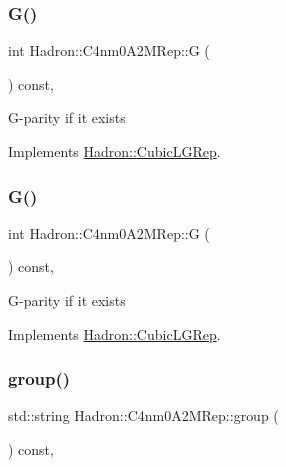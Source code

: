\subsubsection{\texorpdfstring{G()}{G()}\hspace{0.1cm}{\footnotesize\ttfamily [2/3]}}
{\footnotesize\ttfamily int Hadron\+::\+C4nm0\+A2\+M\+Rep\+::G (\begin{DoxyParamCaption}{ }\end{DoxyParamCaption}) const\hspace{0.3cm}{\ttfamily [inline]}, {\ttfamily [virtual]}}

G-\/parity if it exists 

Implements \mbox{\hyperlink{structHadron_1_1CubicLGRep_ace26f7b2d55e3a668a14cb9026da5231}{Hadron\+::\+Cubic\+L\+G\+Rep}}.

\mbox{\label{structHadron_1_1C4nm0A2MRep_a36640a5b382aca709c5523a79cef513f}} 
\subsubsection{\texorpdfstring{G()}{G()}\hspace{0.1cm}{\footnotesize\ttfamily [3/3]}}
{\footnotesize\ttfamily int Hadron\+::\+C4nm0\+A2\+M\+Rep\+::G (\begin{DoxyParamCaption}{ }\end{DoxyParamCaption}) const\hspace{0.3cm}{\ttfamily [inline]}, {\ttfamily [virtual]}}

G-\/parity if it exists 

Implements \mbox{\hyperlink{structHadron_1_1CubicLGRep_ace26f7b2d55e3a668a14cb9026da5231}{Hadron\+::\+Cubic\+L\+G\+Rep}}.

\mbox{\label{structHadron_1_1C4nm0A2MRep_a45255be18f2b1908fcae5e6801e6778f}} 
\subsubsection{\texorpdfstring{group()}{group()}\hspace{0.1cm}{\footnotesize\ttfamily [1/3]}}
{\footnotesize\ttfamily std\+::string Hadron\+::\+C4nm0\+A2\+M\+Rep\+::group (\begin{DoxyParamCaption}{ }\end{DoxyParamCaption}) const\hspace{0.3cm}{\ttfamily [inline]}, {\ttfamily [virtual]}}

